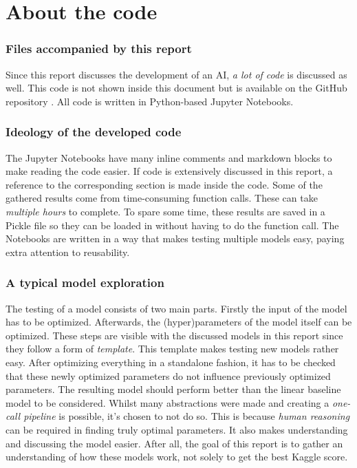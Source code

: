 \part{About the code}
\label{part:about_the_code}


\section{Files accompanied by this report}
\label{section:inc_files}
Since this report discusses the development of an AI, \textit{a lot of code} is discussed as well.
This code is not shown inside this document but is available on the GitHub repository \citep{github_project}.
All code is written in Python-based Jupyter Notebooks.



\section{Ideology of the developed code}
\label{section:ideology_dev_code}
The Jupyter Notebooks have many inline comments and markdown blocks to make reading the code easier.
If code is extensively discussed in this report, a reference to the corresponding section is made inside the code. 
Some of the gathered results come from time-consuming function calls.
These can take \textit{multiple hours} to complete.
To spare some time, these results are saved in a Pickle file so they can be loaded in without having to do the function call.
The Notebooks are written in a way that makes testing multiple models easy, paying extra attention to reusability. 


\section{A typical model exploration}
\label{section:typical_model_exploration}
The testing of a model consists of two main parts.
Firstly the input of the model has to be optimized.
Afterwards, the (hyper)parameters of the model itself can be optimized.
These steps are visible with the discussed models in this report since they follow a form of \emph{template}.
This template makes testing new models rather easy.
After optimizing everything in a standalone fashion, it has to be checked that these newly optimized parameters do not influence previously optimized parameters.
The resulting model should perform better than the linear baseline model to be considered.
Whilst many abstractions were made and creating a \emph{one-call pipeline} is possible, it's chosen to not do so.
This is because \textit{human reasoning} can be required in finding truly optimal parameters.
It also makes understanding and discussing the model easier.
After all, the goal of this report is to gather an understanding of how these models work, not solely to get the best Kaggle score.

